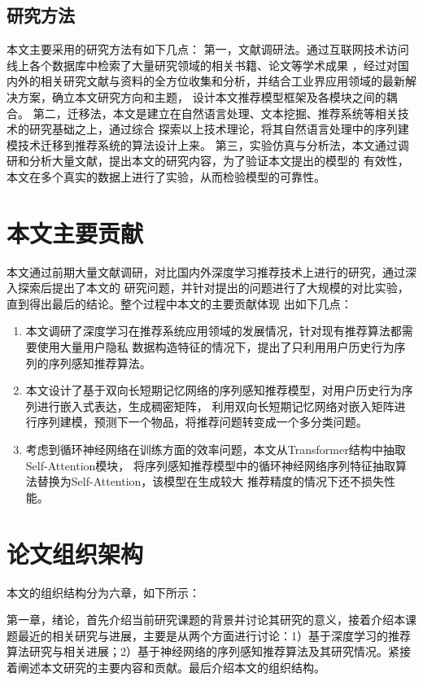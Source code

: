 \subsection{研究方法}
本文主要采用的研究方法有如下几点：
第一，文献调研法。通过互联网技术访问线上各个数据库中检索了大量研究领域的相关书籍、论文等学术成果%
，经过对国内外的相关研究文献与资料的全方位收集和分析，并结合工业界应用领域的最新解决方案，确立本文研究方向和主题，%
设计本文推荐模型框架及各模块之间的耦合。
第二，迁移法，本文是建立在自然语言处理、文本挖掘、推荐系统等相关技术的研究基础之上，通过综合%
探索以上技术理论，将其自然语言处理中的序列建模技术迁移到推荐系统的算法设计上来。
第三，实验仿真与分析法，本文通过调研和分析大量文献，提出本文的研究内容，为了验证本文提出的模型的%
有效性，本文在多个真实的数据上进行了实验，从而检验模型的可靠性。

\section{本文主要贡献}
本文通过前期大量文献调研，对比国内外深度学习推荐技术上进行的研究，通过深入探索后提出了本文的%
研究问题，并针对提出的问题进行了大规模的对比实验，直到得出最后的结论。整个过程中本文的主要贡献体现%
出如下几点：
\begin{enumerate}
    \item 本文调研了深度学习在推荐系统应用领域的发展情况，针对现有推荐算法都需要使用大量用户隐私%
          数据构造特征的情况下，提出了只利用用户历史行为序列的序列感知推荐算法。
    \item 本文设计了基于双向长短期记忆网络的序列感知推荐模型，对用户历史行为序列进行嵌入式表达，生成稠密矩阵，%
          利用双向长短期记忆网络对嵌入矩阵进行序列建模，预测下一个物品，将推荐问题转变成一个多分类问题。
    \item 考虑到循环神经网络在训练方面的效率问题，本文从Transformer结构中抽取Self-Attention模块，%
          将序列感知推荐模型中的循环神经网络序列特征抽取算法替换为Self-Attention，该模型在生成较大%
          推荐精度的情况下还不损失性能。
\end{enumerate}


\section{论文组织架构}
本文的组织结构分为六章，如下所示：

第一章，绪论，首先介绍当前研究课题的背景并讨论其研究的意义，接着介绍本课题最近的相关研究与进展，主要是从两个方面进行讨论：1）基于深度学习的推荐算法研究与相关进展；2）基于神经网络的序列感知推荐算法及其研究情况。紧接着阐述本文研究的主要内容和贡献。最后介绍本文的组织结构。

